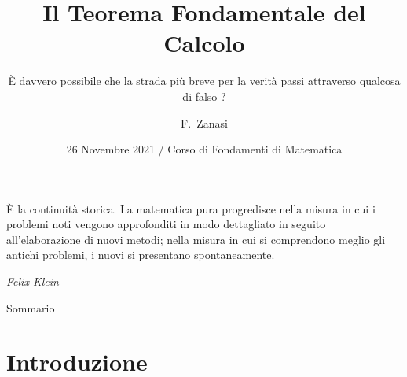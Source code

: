 \documentclass[8pt]{beamer}
\title[Il Teorema Fondamentale del Calcolo] %
{Il Teorema Fondamentale del Calcolo}
\subtitle
{È davvero possibile che la strada più breve per la verità passi attraverso qualcosa di falso ? \cite{Stillwell}} %
\author[F.~Zanasi, Matricola 48359] %
{F.~Zanasi\inst{1} }
\institute[Universities of Somewhere and Elsewhere] %
{
  \inst{1}%
  Corso di Laurea in Didattica e Comunicazione delle Scienze\\
  Università di Modena e Reggio Emilia
}
\date[Short Occasion] %
{26 Novembre 2021 / Corso di Fondamenti di Matematica}
\begin{document}
\begin{frame}
  \titlepage
  \epigraph{È la continuità storica. La matematica pura progredisce nella misura in cui i problemi noti vengono
  approfonditi in modo dettagliato in seguito all'elaborazione di nuovi metodi; nella misura in cui 
  si comprendono meglio gli antichi problemi, i nuovi si presentano spontaneamente.}{\textit{Felix Klein}}

\end{frame}

\begin{frame}{Sommario}
  \tableofcontents
\end{frame}

\section{Introduzione}
\end{document}
